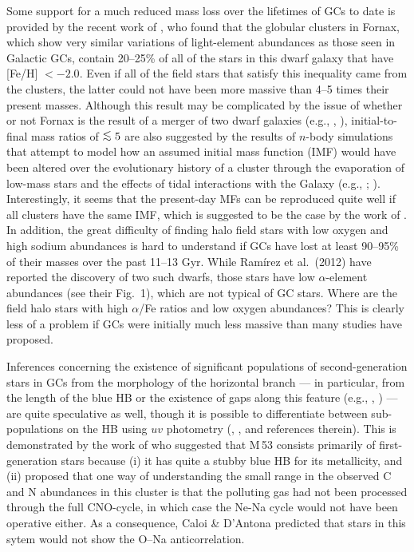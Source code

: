\documentclass[12pt,preprint]{aastex}
\newcommand\lta{\mathrel{\hbox{\raise 0.6 ex \hbox{$<$}\kern
                   -1.8 ex\lower .5 ex\hbox{$\sim$}}}}
\begin{document}
Some support for a much reduced mass loss over the lifetimes of GCs to date is
provided by the recent work of \citet{lsb12}, who found that the globular
clusters in Fornax, which show very similar variations of light-element
abundances as those seen in Galactic GCs, contain 20--25\% of all of the stars
in this dwarf galaxy that have [Fe/H] $< -2.0$.  Even if all of the field stars
that satisfy this inequality came from the clusters, the latter could not have
been more massive than 4--5 times their present masses.  Although this result
may be complicated by the issue of whether or not Fornax is the result of a
merger of two dwarf galaxies (e.g., \citealt{cdb05}, \citealt{yb12}),
initial-to-final mass ratios of $\lta 5$ are also suggested by the results of
$n$-body simulations that attempt to model how an assumed initial mass function
(IMF) would have been altered over the evolutionary history of a cluster through
the evaporation of low-mass stars and the effects of tidal interactions with the
Galaxy (e.g., \citealt{bdk08}; \citealt{zkb11}).  Interestingly, it seems that
the present-day MFs can be reproduced quite well if all clusters have the same
IMF, which is suggested to be the case by the work of \citet{lus12}.   In
addition, the great difficulty of finding halo field stars with low oxygen and
high sodium abundances is hard to understand if GCs have lost at least 90--95\%
of their masses over the past 11--13 Gyr.  While Ram\'irez et al.~(2012) have
reported the discovery of two such dwarfs, those stars have low $\alpha$-element
abundances (see their Fig.~1), which are not typical of GC stars.  Where are
the field halo stars with high $\alpha$/Fe ratios and low oxygen abundances?
This is clearly less of a problem if GCs were initially much less massive than
many studies have proposed.

Inferences concerning the existence of significant populations of
second-generation stars in GCs from the morphology of the horizontal branch ---
in particular, from the length of the blue HB or the existence of gaps along
this feature (e.g., \citealt{dc08}, \citealt{gcb10}) --- are quite speculative
as well, though it is possible to differentiate between sub-populations on the
HB using $uv$ photometry (\citealt{dsf13}, \citealt{gls13}, and references
therein).  This is demonstrated by the work of \citet{cd11} who suggested that
M$\,$53 consists primarily of first-generation stars because (i)
it has quite a stubby blue HB for its metallicity, and (ii) \citet{msb08}
proposed that one way of understanding the small range in the observed C and
N abundances in this cluster is that the polluting gas had not been processed
through the full CNO-cycle, in which case the Ne-Na cycle would not have been
operative either.  As a consequence, Caloi \& D'Antona predicted that stars in
this sytem would not show the O--Na anticorrelation.  
\end{document}
